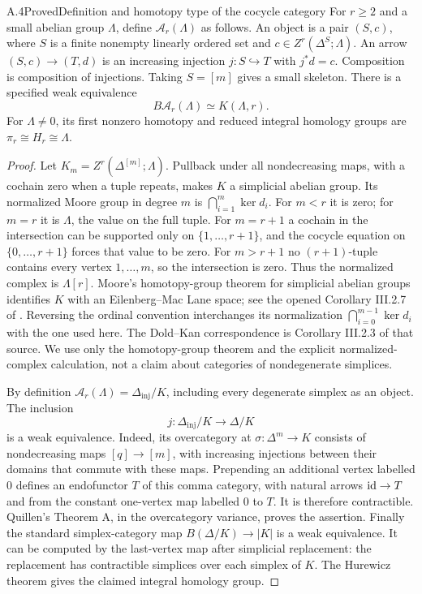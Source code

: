 \begin{claim}{A.4}{Proved}{Definition and homotopy type of the cocycle category}\label{A:cocycle-category}
For $r\geq2$ and a small abelian group $\Lambda$, define $\mathcal A_r(\Lambda)$ as follows. An object is a pair $(S,c)$, where $S$ is a finite nonempty linearly ordered set and $c\in Z^r(\Delta^S;\Lambda)$. An arrow $(S,c)\to(T,d)$ is an increasing injection $j:S\hookrightarrow T$ with $j^*d=c$. Composition is composition of injections. Taking $S=[m]$ gives a small skeleton. There is a specified weak equivalence
\[
 B\mathcal A_r(\Lambda)\simeq K(\Lambda,r).
\]
For $\Lambda\ne0$, its first nonzero homotopy and reduced integral homology groups are $\pi_r\cong H_r\cong\Lambda$.
\end{claim}
\begin{proof}
Let $K_m=Z^r(\Delta^{[m]};\Lambda)$. Pullback under all nondecreasing maps, with a cochain zero when a tuple repeats, makes $K$ a simplicial abelian group. Its normalized Moore group in degree $m$ is $\bigcap_{i=1}^m\ker d_i$. For $m<r$ it is zero; for $m=r$ it is $\Lambda$, the value on the full tuple. For $m=r+1$ a cochain in the intersection can be supported only on $\{1,\ldots,r+1\}$, and the cocycle equation on $\{0,\ldots,r+1\}$ forces that value to be zero. For $m>r+1$ no $(r+1)$-tuple contains every vertex $1,\ldots,m$, so the intersection is zero. Thus the normalized complex is $\Lambda[r]$. Moore's homotopy-group theorem for simplicial abelian groups identifies $K$ with an Eilenberg--Mac Lane space; see the opened Corollary III.2.7 of \cite{GoerssJardine1999}. Reversing the ordinal convention interchanges its normalization $\bigcap_{i=0}^{m-1}\ker d_i$ with the one used here. The Dold--Kan correspondence is Corollary III.2.3 of that source. We use only the homotopy-group theorem and the explicit normalized-complex calculation, not a claim about categories of nondegenerate simplices.

By definition $\mathcal A_r(\Lambda)=\Delta_{\mathrm{inj}}/K$, including every degenerate simplex as an object. The inclusion
\[
 j:\Delta_{\mathrm{inj}}/K\longrightarrow\Delta/K
\]
is a weak equivalence. Indeed, its overcategory at $\sigma:\Delta^m\to K$ consists of nondecreasing maps $[q]\to[m]$, with increasing injections between their domains that commute with these maps. Prepending an additional vertex labelled $0$ defines an endofunctor $T$ of this comma category, with natural arrows $\mathrm{id}\to T$ and from the constant one-vertex map labelled $0$ to $T$. It is therefore contractible. Quillen's Theorem A, in the overcategory variance, proves the assertion. Finally the standard simplex-category map $B(\Delta/K)\to|K|$ is a weak equivalence. It can be computed by the last-vertex map after simplicial replacement: the replacement has contractible simplices over each simplex of $K$. The Hurewicz theorem gives the claimed integral homology group.
\end{proof}


